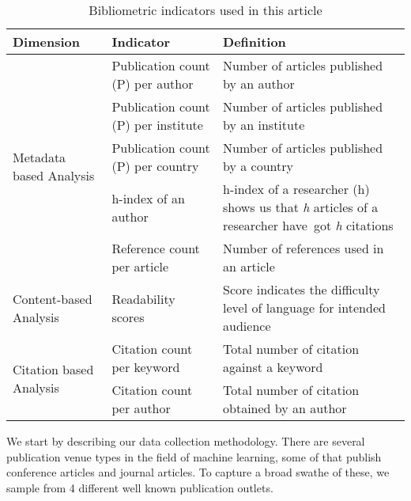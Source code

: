 \begin{table*}[!h]
	\centering
	\footnotesize
	\caption{Bibliometric indicators used in this article}
	\label{tab:table_indicators}
	\begin{adjustbox}{width=1\textwidth}
		\begin{tabular}{m{3.3cm}m{3cm}m{6.5cm}} 
			\hline
			Dimension                                 & Indicator                           & Definition                                                                                                                         \\ 
			\hline
			\multirow{5}{*}{Metadata based Analysis} & Publication count (P) per author    & Number of articles published by an author                                                                                            \\ 
			
			& Publication count (P) per institute & Number of articles published by an institute \\ 
			
			& Publication count (P) per country   & Number of articles published by a country                                                                                            \\ 
			
			& h-index of an author                & h-index of a researcher (h) shows us that \textit{h} articles of a researcher have~got \textit{h} citations \\ 
			
			& Reference count per article           & Number of references used in an article                                                                                               \\ 
			\hline
			Content-based Analysis                    & Readability scores                  & Score indicates the difficulty level of language for intended audience              \\ 
			\hline
			\multirow{2}{*}{Citation based Analysis}  & Citation count per keyword          & Total number of citation against a keyword                                                                                         \\ 
			
			& Citation count per author           & Total number of citation obtained by an author                                                                                     \\
			\hline
		\end{tabular}
	\end{adjustbox}
\end{table*}
We start by describing our data collection methodology. There are several publication venue types in the field of machine learning, some of that publish conference articles and journal articles. To capture a broad swathe of these, we sample 
from 4 different well known publication outlets. 


